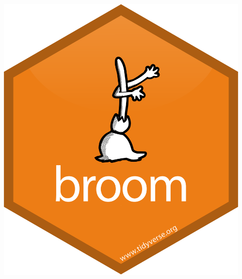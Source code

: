 \documentclass[aspectratio=169]{beamer}
\theoremstyle{remark}
\begin{document}
\begin{frame}
\begin{columns}
\begin{column}{0.33\textwidth}
            \includegraphics[height=0.1\textheight]{./figures/broom.png}
        \end{column}
        \begin{column}{0.33\textwidth}
            \centering

\end{column}
\end{columns}
\end{frame}
\end{document}
